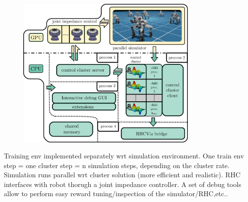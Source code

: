 \begin{Large}
	\vskip1cm
	\begin{figure}[h]
		\includegraphics[width=0.8\textwidth]{docs/imgs/cocluster_arch_full.pdf}
	\end{figure}
	Training env implemented separately wrt simulation environment. One train env step = one cluster step = n simulation steps, depending on the cluster rate.
	Simulation runs parallel wrt cluster solution (more efficient and realistic).
	RHC interfaces with robot thorugh a joint impedance controller. A set of debug tools allow to perform easy reward tuning/inspection of the simulator/RHC,etc..
\end{Large}